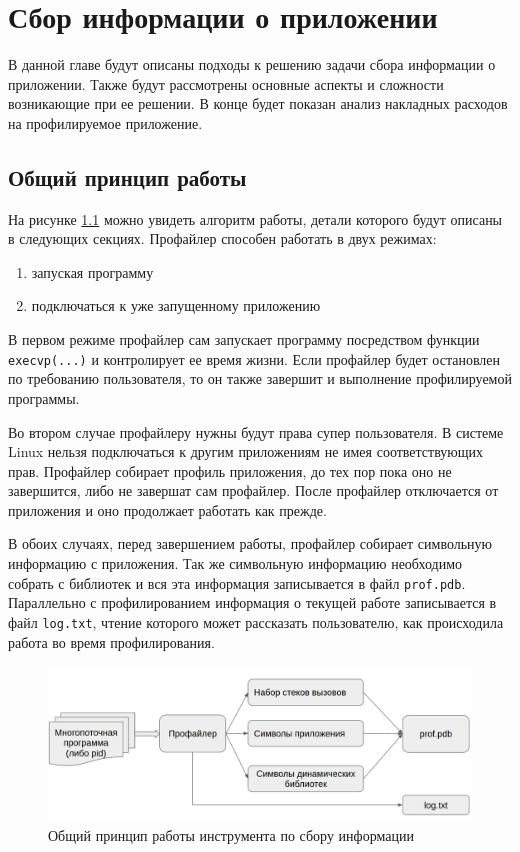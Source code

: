 
\chapter{Сбор информации о приложении}
	В данной главе будут описаны подходы к решению задачи сбора информации о приложении. Также будут рассмотрены основные аспекты и сложности возникающие при ее решении. В конце будет показан анализ накладных расходов на профилируемое приложение. 

\section{Общий принцип работы}
	На рисунке \ref{fig:general_profiler} можно увидеть алгоритм работы, детали которого будут описаны в следующих секциях. Профайлер способен работать в двух режимах: 

\begin{enumerate}
	\item запуская программу
    \item подключаться к уже запущенному приложению
\end{enumerate}

	В первом режиме профайлер сам запускает программу посредством функции \verb|execvp(...)| и контролирует ее время жизни. Если профайлер будет остановлен по требованию пользователя, то он также завершит и выполнение профилируемой программы.
    
    Во втором случае профайлеру нужны будут права супер пользователя. В системе Linux нельзя подключаться к другим приложениям не имея соответствующих прав. Профайлер собирает профиль приложения, до тех пор пока оно не завершится, либо не завершат сам профайлер. После профайлер отключается от приложения и оно продолжает работать как прежде.
    
    В обоих случаях, перед завершением работы, профайлер собирает символьную информацию с приложения. Так же символьную информацию необходимо собрать с библиотек и вся эта информация записывается в файл \verb|prof.pdb|. Параллельно с профилированием информация о текущей работе записывается в файл \verb|log.txt|, чтение которого может рассказать пользователю, как происходила работа во время профилирования.
    
    \begin{figure}[H]
        \caption{Общий принцип работы инструмента по сбору информации}
        \label{fig:general_profiler}
        \centering
        \includegraphics[width=\linewidth]{images/general_profiler}
    \end{figure}    
    
